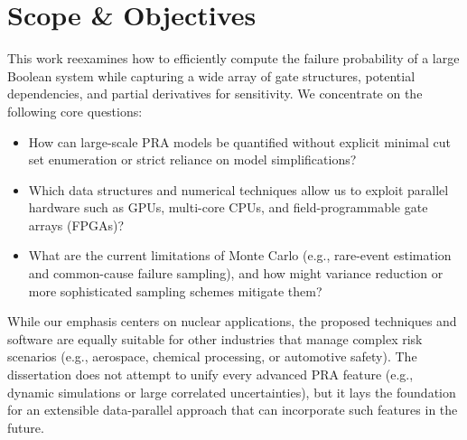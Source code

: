 \section{Scope \& Objectives}
This work reexamines how to efficiently compute the failure probability of a large Boolean system while capturing a wide array of gate structures, potential dependencies, and partial derivatives for sensitivity. We concentrate on the following core questions:

\begin{itemize}
   \item How can large-scale PRA models be quantified without explicit minimal cut set enumeration or strict reliance on model simplifications?
   \item Which data structures and numerical techniques allow us to exploit parallel hardware such as GPUs, multi-core CPUs, and field-programmable gate arrays (FPGAs)?
   \item What are the current limitations of Monte Carlo (e.g., rare-event estimation and common-cause failure sampling), and how might variance reduction or more sophisticated sampling schemes mitigate them?
\end{itemize}
While our emphasis centers on nuclear applications, the proposed techniques and software are equally suitable for other industries that manage complex risk scenarios (e.g., aerospace, chemical processing, or automotive safety). The dissertation does not attempt to unify every advanced PRA feature (e.g., dynamic simulations or large correlated uncertainties), but it lays the foundation for an extensible data-parallel approach that can incorporate such features in the future.